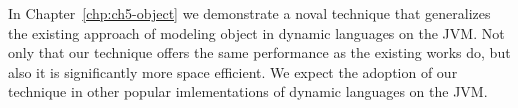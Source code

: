 In Chapter~\ref{chp:ch5-object} we demonstrate a noval technique that generalizes the existing approach of modeling object in dynamic languages on the JVM.
Not only that our technique offers the same performance as the existing works do, but also it is significantly more space efficient.
We expect the adoption of our technique in other popular imlementations of dynamic languages on the JVM.